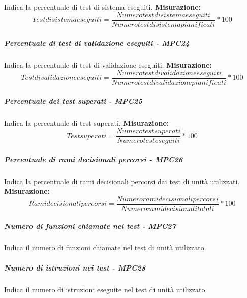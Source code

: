 Indica la percentuale di test di sistema eseguiti.
\textbf{Misurazione:}\begin{equation}
Test di sistema eseguiti = \frac{Numero test di sistema eseguiti}{Numero test di sistema pianificati} * 100
\end{equation}
\subparagraph{Percentuale di test di validazione eseguiti - MPC24}
Indica la percentuale di test di validazione eseguiti.
\textbf{Misurazione:}\begin{equation}
Test di validazione eseguiti = \frac{Numero test di validazione eseguiti}{Numero test di validazione pianificati} * 100
\end{equation}
\subparagraph{Percentuale dei test superati - MPC25}
Indica la percentuale di test superati.
\textbf{Misurazione:}\begin{equation}
Test superati = \frac{Numero test superati}{Numero test eseguiti} * 100
\end{equation}
\subparagraph{Percentuale di rami decisionali percorsi - MPC26}
Indica la percentuale di rami decisionali percorsi dai test di unità utilizzati.
\textbf{Misurazione:}\begin{equation}
Rami decisionali percorsi = \frac{Numero rami decisionali percorsi}{Numero rami decisionali totali} * 100
\end{equation}
\subparagraph{Numero di funzioni chiamate nei test - MPC27}
Indica il numero di funzioni chiamate nel test di unità utilizzato.
\subparagraph{Numero di istruzioni nei test - MPC28}
Indica il numero di istruzioni eseguite nel test di unità utilizzato.


